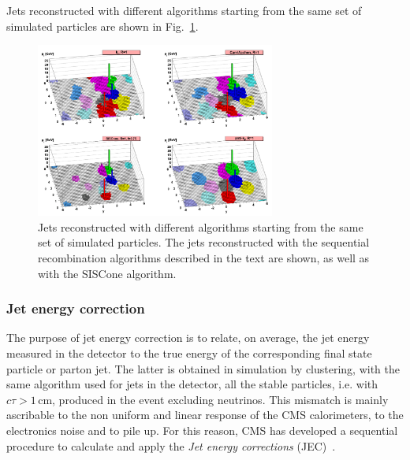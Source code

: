 Jets reconstructed with different algorithms starting from the same set of simulated particles are shown in Fig.~\ref{fig:jets}.

\begin{figure}[htb]
\centering
\includegraphics[width=0.7\textwidth]{images/jets.png}
\caption{Jets reconstructed with different algorithms starting from the same set of simulated particles. The jets reconstructed with the sequential recombination algorithms described in the text are shown, as well as with the SISCone algorithm.}\label{fig:jets}
\end{figure}

\subsubsection{Jet energy correction}

The purpose of jet energy correction is to relate, on average, the jet energy measured in the detector to the true energy of the corresponding final state particle or parton jet. The latter is obtained in simulation by clustering, with the same algorithm used for jets in the detector, all the stable particles, i.e. with $c\tau > 1$\,cm, produced in the event excluding neutrinos. This mismatch is mainly ascribable to the non uniform and linear response of the CMS calorimeters, to the electronics noise and to pile up. For this reason, CMS has developed a sequential procedure to calculate and apply the \emph{Jet energy corrections} (JEC)~\cite{Chatrchyan:2011ds}.

